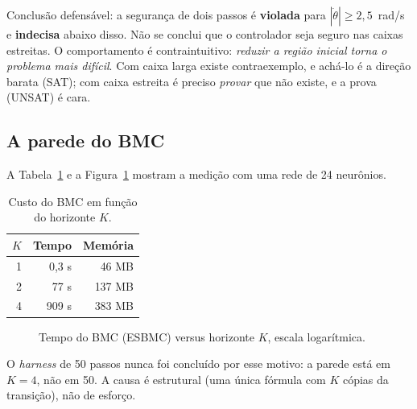 \documentclass[12pt,openright,oneside,a4paper,chapter=TITLE,sumario=tradicional,english,brazil]{abntex2}
\begin{document}
Conclusão defensável: a segurança de dois passos é \textbf{violada} para $|\dot\theta|\ge2{,}5$~rad/s e \textbf{indecisa} abaixo disso. Não se conclui que o controlador seja seguro nas caixas estreitas. O comportamento é contraintuitivo: \emph{reduzir a região inicial torna o problema mais difícil}. Com caixa larga existe contraexemplo, e achá-lo é a direção barata (SAT); com caixa estreita é preciso \emph{provar} que não existe, e a prova (UNSAT) é cara.

\subsection{A parede do BMC}\label{sec:parede}

A Tabela~\ref{tab:parede} e a Figura~\ref{fig:parede} mostram a medição com uma rede de 24 neurônios.

\begin{table}[htb]
\caption{Custo do BMC em função do horizonte $K$.}\label{tab:parede}
\centering
\begin{tabular}{r|r|r}
\toprule
$K$ & Tempo & Memória \\
\midrule
1 & 0,3 s & 46 MB \\
2 & 77 s  & 137 MB \\
4 & 909 s & 383 MB \\
\bottomrule
\end{tabular}
\end{table}

\begin{figure}[htb]
  \caption{Tempo do BMC (ESBMC) versus horizonte $K$, escala logarítmica.}\label{fig:parede}
  \centering
\end{figure}

O \emph{harness} de 50 passos nunca foi concluído por esse motivo: a parede está em $K{=}4$, não em 50. A causa é estrutural (uma única fórmula com $K$ cópias da transição), não de esforço.
\end{document}
